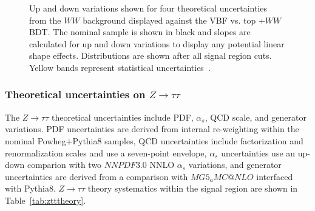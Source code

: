 \begin{figure}[!h]
  \hfill
  \hfill
{\caption{Up and down variations shown for four theoretical uncertainties from the $WW$ background displayed against the VBF vs. top +$WW$ BDT. The nominal sample is shown in black and slopes are calculated for up and down variations to display any potential linear shape effects. Distributions are shown after all signal region cuts. Yellow bands represent statistical uncertainties~\cite{ourSupportNote}.
\label{fig:wwtheor}}}
\end{figure}

\subsubsection{Theoretical uncertainties on $Z\rightarrow\tau\tau$}

The $Z\rightarrow\tau\tau$ theoretical uncertainties include PDF, $\alpha_s$, QCD scale, and generator variations. PDF uncertainties are derived from internal re-weighting within the nominal Powheg$+$Pythia8 samples, QCD uncertainties include factorization and renormalization scales and use a seven-point envelope, $\alpha_s$ uncertainties use an up-down comparion with two $NNPDF3.0$ NNLO $\alpha_s$ variations, and generator uncertainties are derived from a comparison with $MG5_aMC@NLO$ interfaced with Pythia8. $Z\rightarrow\tau\tau$ theory systematics within the signal region are shown in Table~\ref{tab:ztttheory}.

